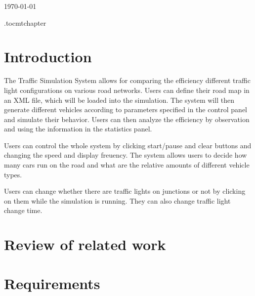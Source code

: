 \documentclass[a4paper,12pt]{article}
\begin{document}
\begin{titlepage}
{\large \today}\\[3cm] %




\vfill %

\end{titlepage}

\etocdepthtag.toc{mtchapter}
\tableofcontents

\newpage

\section{Introduction}
The Traffic Simulation System allows for comparing the efficiency different traffic light configurations on various road networks. Users can define their road map in an XML file, which will be loaded into the simulation. The system will then generate different vehicles according to parameters specified in the control panel and simulate their behavior. Users can then analyze the efficiency by observation and using the information in the statistics panel.

Users can control the whole system by clicking start/pause and clear buttons and changing the speed and display freuency. The system allows users to decide how many cars run on the road and what are the relative amounts of different vehicle types. 

Users can change whether there are traffic lights on junctions or not by clicking on them while the simulation is running. They can also change traffic light change time.

\section{Review of related work}

\section{Requirements}
\end{document}
